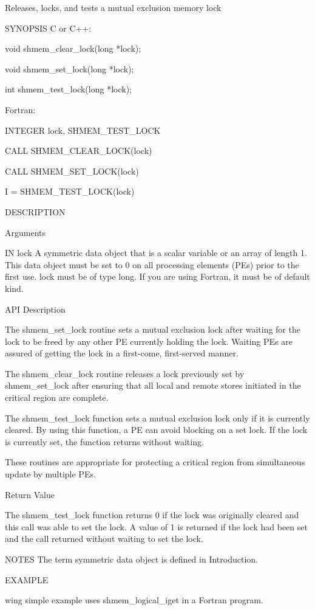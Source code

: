        Releases, locks, and tests a mutual exclusion memory lock

SYNOPSIS
       C or C++:

	  void shmem_clear_lock(long *lock);

	  void shmem_set_lock(long *lock);

	  int shmem_test_lock(long *lock);

       Fortran:

	  INTEGER lock, SHMEM_TEST_LOCK

	  CALL SHMEM_CLEAR_LOCK(lock)

	  CALL SHMEM_SET_LOCK(lock)

	  I = SHMEM_TEST_LOCK(lock)

DESCRIPTION

Arguments

       IN	lock	 A symmetric data object that is a scalar variable or an array
		 of  length  1.	  This	data  object  must  be set to 0 on all
		 processing elements (PEs) prior to the first use.  lock  must
		 be  of	 type  long.   If you are using Fortran, it must be of
		 default kind.

API Description

       The shmem_set_lock routine sets a mutual exclusion lock	after  waiting
       for  the	 lock  to be freed by any other PE currently holding the lock.
       Waiting	PEs  are  assured  of  getting	the  lock  in  a   first-come,
       first-served manner.

       The   shmem_clear_lock  routine	releases  a  lock  previously  set  by
       shmem_set_lock  after  ensuring	that  all  local  and  remote	stores
       initiated in the critical region are complete.

       The shmem_test_lock function sets a mutual exclusion lock only if it is
       currently cleared.  By using this function, a PE can avoid blocking  on
       a set lock.  If the lock is currently set, the function returns without
       waiting.

       These routines are appropriate for protecting a	critical  region  from
       simultaneous  update  by	 multiple  PEs.	  

Return Value

       The shmem_test_lock function returns  0	if  the	 lock  was  originally
       cleared	and  this  call	 was  able  to	set the lock.  A value of 1 is
       returned if the lock had been set and the call returned without waiting
       to set the lock.

NOTES
       The term symmetric data object is defined in Introduction.

EXAMPLE
	
	
wing  simple  example	uses  shmem_logical_iget  in a Fortran
       program.	 

	
